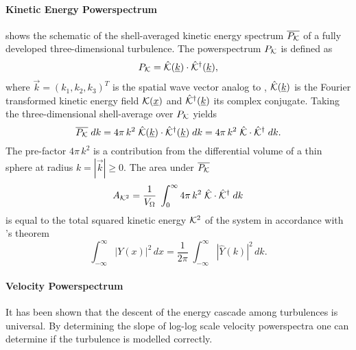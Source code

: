 \paragraph{Kinetic Energy Powerspectrum}
\newcommand{\pekin}{P_{\ekin}}

 shows the schematic of the shell-averaged
kinetic energy spectrum $\overline{\pekin}$ of a fully developed three-dimensional
turbulence. The powerspectrum $\pekin$ is defined as
\begin{equation}
    \pekin = \hat{\ekin}(\vec{k}) \cdot \hat{\ekin}^{\dagger}(\vec{k}),
\end{equation}
where $\vec{k} = (k_1,k_2,k_3)^T$  is the spatial wave vector analog to
, $\hat{\mathcal{K}}(\underline{k})$ is the Fourier transformed kinetic
energy field $\mathcal{K}(\underline{x})$ and $\hat{\mathcal{K}}^{\dagger}(\underline{k})$ its complex
conjugate.  Taking the three-dimensional shell-average over $\pekin$
yields
\begin{equation}
\label{eqn:pws-ekin}
    \overline{\pekin} \; dk = 4\pi\,k^2 \; \hat{\ekin}(\vec{k}) \cdot \hat{\ekin}^{\dagger}(\vec{k}) \; dk
        = 4\pi\,k^2 \; \hat{\ekin} \cdot \hat{\ekin}^{\dagger} \; dk
.
\end{equation}
The pre-factor $4 \pi\,k^2$ is a contribution from the differential volume of a
thin sphere at radius $k = |\vec{k}| \ge 0$.  The area under
$\overline{\pekin}$
\begin{equation}
    A_{\mathcal{K}^2} = \frac{1}{V_{\Omega}} \; \int_0^\infty 4\pi\,k^2 \; \hat{\mathcal{K}} \cdot \hat{\mathcal{K}}^{\dagger} \; dk
\end{equation}
is equal to the total squared kinetic energy $\mathcal{K}^2$ of the system in
accordance with 's theorem
\begin{equation}
    \int_{-\infty}^{\infty} |Y(x)|^2 \, dx = \frac{1}{2\pi} \; \int_{-\infty}^{\infty} |\hat{Y}(k)|^2 \,dk.
\end{equation}

\paragraph{Velocity Powerspectrum}
\newcommand{\pvels}{P_{\vels}}
\newcommand{\pmvels}{P_{m\vels}}
It has been shown that the descent of the energy cascade among turbulences
is universal. By determining the slope of log-log scale velocity powerspectra
one can determine if the turbulence is modelled correctly.

